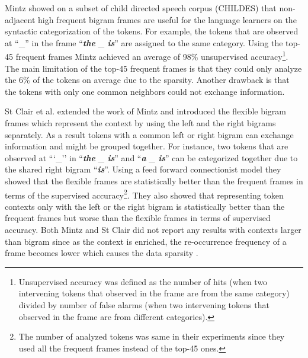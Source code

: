 Mintz  showed on a subset of child
directed speech corpus (CHILDES) \cite{macwhinney2000childes} that
non-adjacent high frequent bigram frames are useful for the language
learners on the syntactic categorization of the tokens.  For example,
the tokens that are observed at ``\_'' in the frame ``{\em {\bf the}
  \_ {\bf is}}'' are assigned to the same category.  Using the top-45
frequent frames Mintz achieved an average of 98\% unsupervised
accuracy\footnote{Unsupervised accuracy was defined as the number of
  hits (when two intervening tokens that observed in the frame are
  from the same category) divided by number of false alarms (when two
  intervening tokens that observed in the frame are from different
  categories).}.  The main limitation of the top-45 frequent frames is
that they could only analyze the 6\% of the tokens on average due to
the sparsity.  Another drawback is that the tokens with only one
common neighbors could not exchange information.

St Clair et al.   extended the work of Mintz
 and introduced the flexible bigram
frames which represent the context by using the left and the right
bigrams separately.  As a result tokens with a common left or right
bigram can exchange information and might be grouped together.  For
instance, two tokens that are observed at ```\_'' in ``{\em {\bf the}
  \_ {\bf is}}'' and ``{\em {\bf a} \_ {\bf is}}'' can be categorized
together due to the shared right bigram ``{\em{\bf is}}''.  Using a
feed forward connectionist model they showed that the flexible frames
are statistically better than the frequent frames in terms of the
supervised accuracy\footnote{The number of analyzed tokens was same in
  their experiments since they used all the frequent frames instead of
  the top-45 ones.}.  They also showed that representing token
contexts only with the left or the right bigram is statistically
better than the frequent frames but worse than the flexible frames in
terms of supervised accuracy.  Both Mintz
 and St Clair  did
not report any results with contexts larger than bigram since as the
context is enriched, the re-occurrence frequency of a frame becomes
lower which causes the data sparsity \cite{manning99foundations}.

